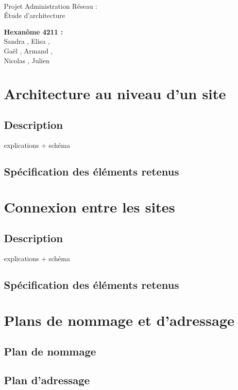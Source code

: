 \documentclass[a4paper]{article}
\begin{document}
\begin{titlepage}
	~ 
	\vfill
	\begin{center}
		\begin{Huge}
			Projet Administration Réseau : \\ Étude d'architecture\\
		\end{Huge}
	\vfill
		\textbf{Hexanôme 4211 :} 
			\\Sandra {}, Elisa , 
			\\Gaël , Armand , 
			\\Nicolas {}, Julien \\
	\vfill
	\end{center}
	\vfill
\end{titlepage}

\newpage
\tableofcontents
\newpage

\section{Architecture au niveau d'un site}
	\subsection{Description}
	explications + schéma 
	\subsection{Spécification des éléments retenus}

\section{Connexion entre les sites}
	\subsection{Description}
	explications + schéma 
	\subsection{Spécification des éléments retenus}
	
\section{Plans de nommage et d'adressage}
	\subsection{Plan de nommage}
	\subsection{Plan d'adressage}

	
\end{document}

